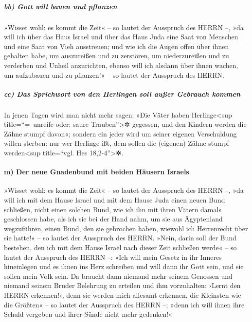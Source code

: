 \hypertarget{bb-gott-will-bauen-und-pflanzen}{%
\subparagraph{bb) Gott will bauen und
pflanzen}\label{bb-gott-will-bauen-und-pflanzen}}

»Wisset wohl: es kommt die Zeit« -- so lautet der
Ausspruch des HERRN --, »da will ich über das Haus Israel und über das
Haus Juda eine Saat von Menschen und eine Saat von Vieh ausstreuen;
und wie ich die Augen offen über ihnen gehalten habe, um
auszureißen und zu zerstören, um niederzureißen und zu verderben und
Unheil anzurichten, ebenso will ich alsdann über ihnen wachen, um
aufzubauen und zu pflanzen!« -- so lautet der Ausspruch des HERRN.

\hypertarget{cc-das-sprichwort-von-den-herlingen-soll-auuxdfer-gebrauch-kommen}{%
\subparagraph{cc) Das Sprichwort von den Herlingen soll außer Gebrauch
kommen}\label{cc-das-sprichwort-von-den-herlingen-soll-auuxdfer-gebrauch-kommen}}

In jenen Tagen wird man nicht mehr sagen: »Die Väter
haben Herlinge\textless sup title=``=~unreife oder: saure
Trauben''\textgreater✲ gegessen, und den Kindern werden die Zähne stumpf
davon«; sondern ein jeder wird um seiner eigenen
Verschuldung willen sterben: nur wer Herlinge ißt, dem sollen die
(eigenen) Zähne stumpf werden\textless sup title=``vgl. Hes
18,2-4''\textgreater✲.

\hypertarget{m-der-neue-gnadenbund-mit-beiden-huxe4usern-israels}{%
\paragraph{m) Der neue Gnadenbund mit beiden Häusern
Israels}\label{m-der-neue-gnadenbund-mit-beiden-huxe4usern-israels}}

»Wisset wohl: es kommt die Zeit« -- so lautet der
Ausspruch des HERRN --, »da will ich mit dem Hause Israel und mit dem
Hause Juda einen neuen Bund schließen, nicht einen
solchen Bund, wie ich ihn mit ihren Vätern damals geschlossen habe, als
ich sie bei der Hand nahm, um sie aus Ägyptenland wegzuführen, einen
Bund, den sie gebrochen haben, wiewohl ich Herrenrecht über sie hatte!«
-- so lautet der Ausspruch des HERRN. »Nein, darin soll
der Bund bestehen, den ich mit dem Hause Israel nach dieser Zeit
schließen werde« -- so lautet der Ausspruch des HERRN --: »Ich will mein
Gesetz in ihr Inneres hineinlegen und es ihnen ins Herz schreiben und
will dann ihr Gott sein, und sie sollen mein Volk sein.
Da braucht dann niemand mehr seinem Genossen und niemand
seinem Bruder Belehrung zu erteilen und ihm vorzuhalten: ›Lernt den
HERRN erkennen!‹, denn sie werden mich allesamt erkennen, die Kleinsten
wie die Größten« -- so lautet der Ausspruch des HERRN --; »denn ich will
ihnen ihre Schuld vergeben und ihrer Sünde nicht mehr gedenken!«

